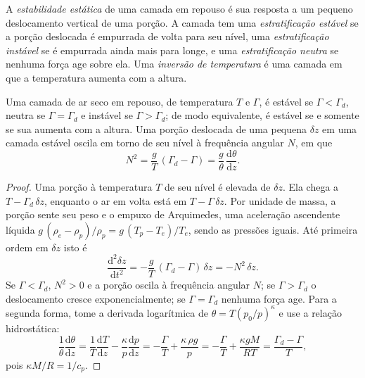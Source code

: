 \begin{definition}\label{def:b1:fluid-envelopes-structure:stability}
A \emph{estabilidade estática} de uma camada em repouso é sua resposta
a um pequeno deslocamento vertical de uma porção. A camada tem uma \emph{estratificação
estável} se a porção deslocada é empurrada de volta para seu nível,
uma \emph{estratificação instável} se é empurrada ainda mais para
longe, e uma \emph{estratificação neutra} se nenhuma força age sobre
ela. Uma \emph{inversão de temperatura} é uma camada em que a
temperatura aumenta com a altura.
\end{definition}

\begin{theorem}\label{thm:b1:fluid-envelopes-structure:stability}
Uma camada de ar seco em repouso, de temperatura $T$ e  $\Gamma$, é estável se
$\Gamma < \Gamma_d$, neutra se $\Gamma = \Gamma_d$ e instável se $\Gamma > \Gamma_d$; de modo
equivalente, é estável se e somente se sua  aumenta com a altura. Uma porção
deslocada de uma pequena $\delta z$ em uma camada estável oscila em torno de seu nível à
frequência angular $N$, em que
\[
  N^2 = \frac{g}{T}\,(\Gamma_d - \Gamma) = \frac{g}{\theta}\,\frac{\mathrm d\theta}{\mathrm dz}.
\]
\end{theorem}

\begin{proof}
Uma porção à temperatura $T$ de seu nível é elevada de $\delta z$. Ela chega a $T - \Gamma_d\,\delta z$,
enquanto o ar em volta está em $T - \Gamma\,\delta z$. Por unidade de massa, a porção sente seu
peso e o empuxo de Arquimedes, uma aceleração ascendente líquida $g\,(\rho_e - \rho_p)/\rho_p = g\,(T_p - T_e)/T_e$, sendo as pressões iguais. Até primeira ordem em $\delta z$ isto é
\[
  \frac{\mathrm d^2 \delta z}{\mathrm dt^2} = -\frac{g}{T}\,(\Gamma_d - \Gamma)\,\delta z = -N^2\,\delta z .
\]
Se $\Gamma < \Gamma_d$, $N^2 > 0$ e a porção oscila à frequência angular $N$; se $\Gamma > \Gamma_d$
o deslocamento cresce exponencialmente; se $\Gamma = \Gamma_d$ nenhuma força age. Para a segunda
forma, tome a derivada logarítmica de $\theta = T (p_0/p)^{\kappa}$ e use a relação hidrostática:
\[
  \frac{1}{\theta}\frac{\mathrm d\theta}{\mathrm dz} = \frac{1}{T}\frac{\mathrm dT}{\mathrm dz}
  - \frac{\kappa}{p}\frac{\mathrm dp}{\mathrm dz} = -\frac{\Gamma}{T} + \frac{\kappa\,\rho g}{p}
  = -\frac{\Gamma}{T} + \frac{\kappa g M}{RT} = \frac{\Gamma_d - \Gamma}{T},
\]
pois $\kappa M/R = 1/c_p$.
\end{proof}

